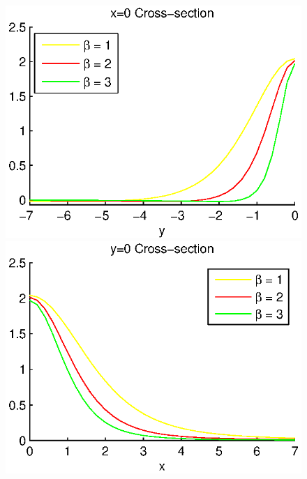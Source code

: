 \documentclass{article}
\begin{document}
\begin{figure}[ht]
	\begin{minipage}[b]{0.5\linewidth}
		\raggedleft
		\includegraphics[width=\linewidth]{../EllipticEquationSJC/cross-sections/c=05beta=1__3x=0.eps}
	\end{minipage}	
	\begin{minipage}[b]{0.5\linewidth}
		\raggedright
		 \includegraphics[width=\linewidth]{../EllipticEquationSJC/cross-sections/c=05beta=1__3y=0.eps}
	\end{minipage}
	\begin{minipage}[b]{0.5\linewidth}
		\raggedleft

\end{minipage}
\end{figure}
\end{document}
